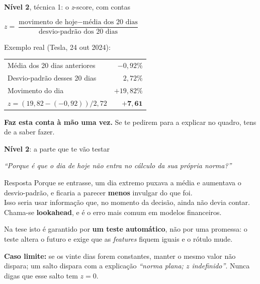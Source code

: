 \documentclass[aspectratio=169]{beamer}
\newcommand{\key}[1]{\textbf{\textcolor{blue!55!black}{#1}}}
\begin{document}
\begin{frame}{\key{Nível 2}, técnica 1: o \emph{z}-score, com contas}
\begin{center}
$z = \dfrac{\text{movimento de hoje} - \text{média dos 20 dias}}{\text{desvio-padrão dos 20 dias}}$
\end{center}
\vspace{3mm}
\small
Exemplo real (Tesla, 24 out 2024):
\begin{center}
\begin{tabular}{lr}
\toprule
Média dos 20 dias anteriores & $-0{,}92\%$ \\
Desvio-padrão desses 20 dias & $2{,}72\%$ \\
Movimento do dia & $+19{,}82\%$ \\
\midrule
$z = (19{,}82 - (-0{,}92)) / 2{,}72$ & $\mathbf{+7{,}61}$ \\
\bottomrule
\end{tabular}
\end{center}
\vspace{2mm}
\footnotesize
\key{Faz esta conta à mão uma vez.} Se te pedirem para a explicar no quadro, tens de a saber fazer.
\end{frame}

\begin{frame}{\key{Nível 2}: a parte que te vão testar}
\begin{center}
\emph{``Porque é que o dia de hoje não entra no cálculo da sua própria norma?''}
\end{center}
\vspace{4mm}
\begin{block}{Resposta}
Porque se entrasse, um dia extremo puxava a média e aumentava o desvio-padrão, e ficaria a
parecer \textbf{menos} invulgar do que foi.\\[2mm]
Isso seria usar informação que, no momento da decisão, ainda não devia contar. Chama-se
\key{lookahead}, e é o erro mais comum em modelos financeiros.
\end{block}
\vspace{2mm}
\footnotesize
Na tese isto é garantido por \textbf{um teste automático}, não por uma promessa: o teste altera o
futuro e exige que as \emph{features} fiquem iguais e o rótulo mude.
\par\smallskip
\textbf{Caso limite:} se os vinte dias forem constantes, manter o mesmo valor não dispara; um salto
dispara com a explicação \emph{``norma plana; $z$ indefinido''}. Nunca digas que esse salto tem
$z=0$.
\end{frame}
\end{document}
